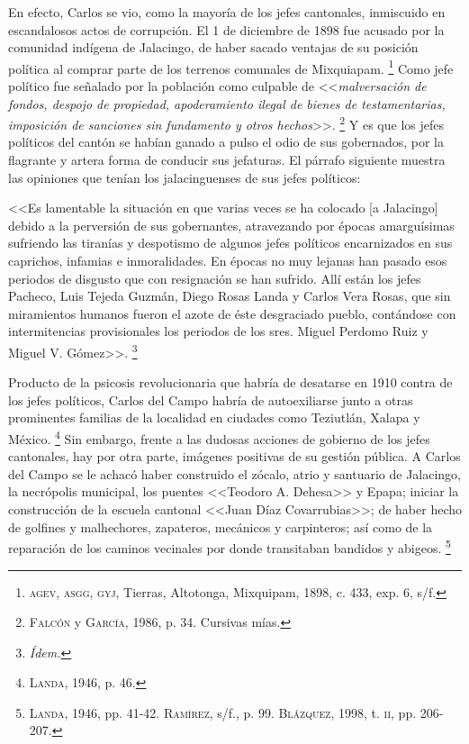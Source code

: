 \documentclass[14pt,twoside,final]{extbook} %
\let\oldfootnote\footnote
\renewcommand\footnote[1]{%
\oldfootnote{\hspace{1mm}#1}}
\begin{document}
En efecto, Carlos se vio, como la mayoría de los jefes cantonales, inmiscuido en escandalosos actos de corrupción. El 1 de diciembre de 1898 fue acusado por la comunidad indígena de Jalacingo, de haber sacado ventajas de su posición política al comprar parte de los terrenos comunales de Mixquiapam.\footnote{\textsc{agev, asgg, gyj}, Tierras, Altotonga, Mixquipam, 1898, c. 433, exp. 6, s/f.} Como jefe político fue señalado por la población como culpable de <<\emph{malversación de fondos, despojo de propiedad, apoderamiento ilegal de bienes de testamentarias, imposición de sanciones sin fundamento y otros hechos}>>.\footnote{\textsc{Falcón} y \textsc{García}, 1986, p. 34. Cursivas mías.} Y es que los jefes políticos del cantón se habían ganado a pulso el odio de sus gobernados, por la flagrante y artera forma de conducir sus jefaturas. El párrafo siguiente muestra las opiniones que tenían los jalacinguenses de sus jefes políticos:
\begin{quoting}
<<Es lamentable la situación en que varias veces se ha colocado [a Jalacingo] debido a la perversión de sus gobernantes, atravezando por épocas amarguísimas sufriendo las tiranías y despotismo de algunos jefes políticos encarnizados en sus caprichos, infamias e inmoralidades. En épocas no muy lejanas han pasado esos periodos de disgusto que con resignación se han sufrido. Allí están los jefes Pacheco, Luis Tejeda Guzmán, Diego Rosas Landa y Carlos Vera Rosas, que sin miramientos humanos fueron el azote de éste desgraciado pueblo, contándose con intermitencias provisionales los periodos de los sres. Miguel Perdomo Ruiz y Miguel V. Gómez>>.\footnote{\em Ídem.}
\end{quoting}
Producto de la psicosis revolucionaria que habría de desatarse en 1910 contra de los jefes políticos, Carlos del Campo habría de autoexiliarse junto a otras prominentes familias de la localidad en ciudades como Teziutlán, Xalapa y México.\footnote{\textsc{Landa}, 1946, p. 46.} Sin embargo, frente a las dudosas acciones de gobierno de los jefes cantonales, hay por otra parte, imágenes positivas de su gestión pública. A Carlos del Campo se le achacó haber construido el zócalo, atrio y santuario de Jalacingo, la necrópolis municipal, los puentes <<Teodoro A. Dehesa>> y Epapa; iniciar la construcción de la escuela cantonal <<Juan Díaz Covarrubias>>; de haber hecho de golfines y malhechores, zapateros, mecánicos y carpinteros; así como de la reparación de los caminos vecinales por donde transitaban bandidos y abigeos.\footnote{\textsc{Landa}, 1946, pp. 41-42. \textsc{Ramírez}, s/f., p. 99. \textsc{Blázquez}, 1998, t. \textsc{ii}, pp. 206-207.}
\end{document}
